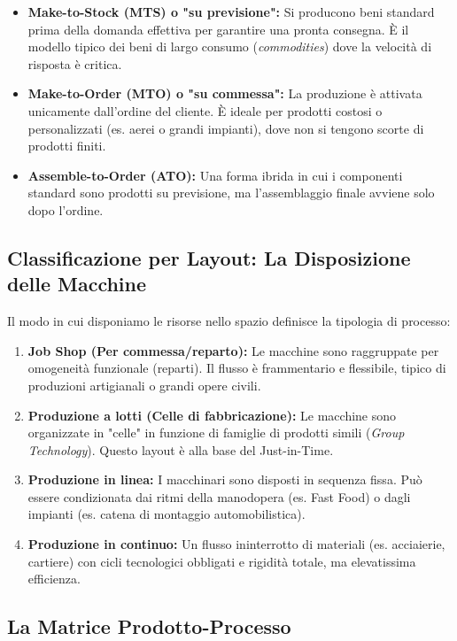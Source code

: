 \documentclass[a4paper,10pt]{article}
\begin{document}
\begin{itemize}
    \item \textbf{Make-to-Stock (MTS) o "su previsione":} Si producono beni standard prima della domanda effettiva per garantire una pronta consegna. È il modello tipico dei beni di largo consumo (\textit{commodities}) dove la velocità di risposta è critica.
    \item \textbf{Make-to-Order (MTO) o "su commessa":} La produzione è attivata unicamente dall'ordine del cliente. È ideale per prodotti costosi o personalizzati (es. aerei o grandi impianti), dove non si tengono scorte di prodotti finiti.
    \item \textbf{Assemble-to-Order (ATO):} Una forma ibrida in cui i componenti standard sono prodotti su previsione, ma l'assemblaggio finale avviene solo dopo l'ordine.
\end{itemize}

\subsection*{Classificazione per Layout: La Disposizione delle Macchine}

Il modo in cui disponiamo le risorse nello spazio definisce la tipologia di processo:

\begin{enumerate}
    \item \textbf{Job Shop (Per commessa/reparto):} Le macchine sono raggruppate per omogeneità funzionale (reparti). Il flusso è frammentario e flessibile, tipico di produzioni artigianali o grandi opere civili.
    \item \textbf{Produzione a lotti (Celle di fabbricazione):} Le macchine sono organizzate in "celle" in funzione di famiglie di prodotti simili (\textit{Group Technology}). Questo layout è alla base del Just-in-Time.
    \item \textbf{Produzione in linea:} I macchinari sono disposti in sequenza fissa. Può essere condizionata dai ritmi della manodopera (es. Fast Food) o dagli impianti (es. catena di montaggio automobilistica).
    \item \textbf{Produzione in continuo:} Un flusso ininterrotto di materiali (es. acciaierie, cartiere) con cicli tecnologici obbligati e rigidità totale, ma elevatissima efficienza.
\end{enumerate}

\subsection*{La Matrice Prodotto-Processo}
\end{document}
